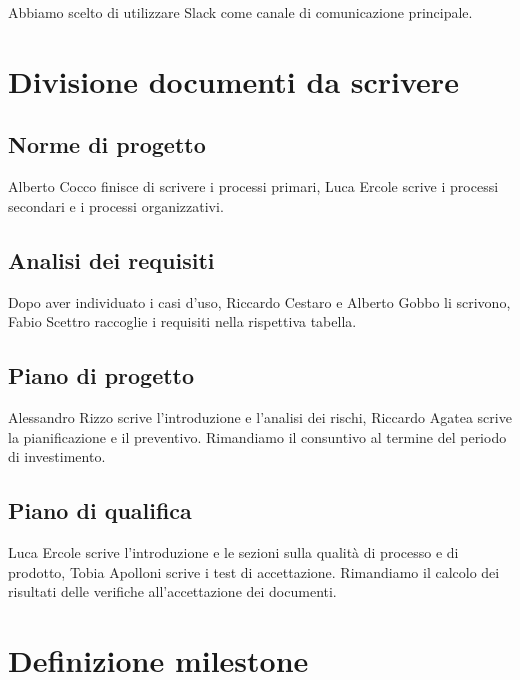 \documentclass{article}
\begin{document}
Abbiamo scelto di utilizzare Slack come canale di comunicazione principale.

\section{Divisione documenti da scrivere}%
\label{sec:divisione_documenti_da_scrivere}

\subsection{Norme di progetto}%
\label{sub:norme_di_progetto}

Alberto Cocco finisce di scrivere i processi primari, Luca Ercole scrive i processi secondari e i processi organizzativi.

\subsection{Analisi dei requisiti}%
\label{sub:analisi_dei_requisiti}

Dopo aver individuato i casi d'uso, Riccardo Cestaro e Alberto Gobbo li scrivono, Fabio Scettro raccoglie i requisiti nella rispettiva tabella.

\subsection{Piano di progetto}%
\label{sub:piano_di_progetto}

Alessandro Rizzo scrive l'introduzione e l'analisi dei rischi, Riccardo Agatea scrive la pianificazione e il preventivo. Rimandiamo il consuntivo al termine del periodo di investimento.

\subsection{Piano di qualifica}%
\label{sub:piano_di_qualifica}
Luca Ercole scrive l'introduzione e le sezioni sulla qualità di processo e di prodotto, Tobia Apolloni scrive i test di accettazione. Rimandiamo il calcolo dei risultati delle verifiche all'accettazione dei documenti.

\section{Definizione milestone}%
\label{sec:definizione_milestone}
\end{document}
